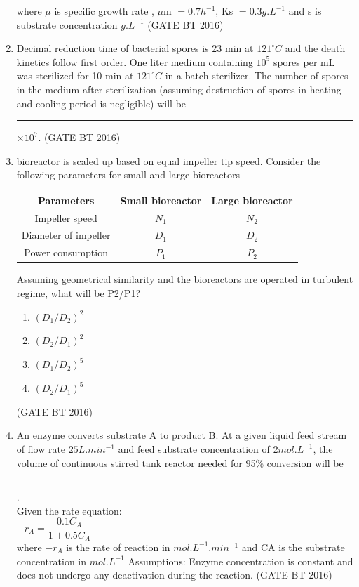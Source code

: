 \documentclass[journal,12pt,onecolumn]{IEEEtran}
\theoremstyle{remark}
\begin{document}
\begin{enumerate}
where $\mu$ is specific growth rate , $\mu$m $= 0.7 h^{-1}$, Ks $= 0.3 g.L^{-1}$ and s is substrate concentration
$g.L^{-1}$ \hfill(GATE BT 2016) 

\item Decimal reduction time of bacterial spores is 23 min at $121^\circ C$ and the death kinetics follow first
order. One liter medium containing $10^5$ spores per mL was sterilized for 10 min at $121^\circ C$ in a batch sterilizer. The number of spores in the medium after sterilization (assuming destruction of spores in heating and cooling period is negligible) will be \rule{2cm }{0.4pt}×$10^7$. \hfill(GATE BT 2016) 


\item bioreactor is scaled up based on equal impeller tip speed. Consider the following parameters for small and large bioreactors\:

\begin{center}
\begin{tabular}{|c|c|c|}
\textbf{Parameters} & \textbf{Small bioreactor} & \textbf{Large bioreactor} \\
Impeller speed & $N_1$ & $N_2$ \\
Diameter of impeller & $D_1$ & $D_2$ \\
Power consumption & $P_1$ & $P_2$ \\
\end{tabular}
\end{center}
Assuming geometrical similarity and the bioreactors are operated in turbulent regime, what will be
P2/P1?
\begin{multicols}{4}
\begin{enumerate}
\item $(D_1/D_2)^2$
\item $(D_2/D_1)^2$
\item $(D_1/D_2)^5$
\item $(D_2/D_1)^5$
\end{enumerate}\end{multicols} \hfill(GATE BT 2016)  

\item An enzyme converts substrate A to product B. At a given liquid feed stream of flow rate $25 L.min^{-1}$
and feed substrate concentration of $2 mol.L^{-1}$, the volume of continuous stirred tank reactor needed
for 95\% conversion will be \rule{2cm}{0.4pt}.\\
Given the rate equation:\\
$-r_A=\dfrac{0.1C_A}{1+0.5C_A}$\\
where $- r_A$ is the rate of reaction in $mol.L^{-1}.min^{-1}$ and CA is the substrate concentration in $mol.L^{-1}$
Assumptions: Enzyme concentration is constant and does not undergo any deactivation during the
reaction. \hfill(GATE BT 2016) 


\end{enumerate}
\end{document}
